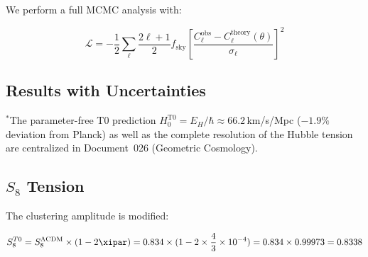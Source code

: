 	We perform a full MCMC analysis with:
	
	\begin{equation}
		\mathcal{L} = -\frac{1}{2}\sum_{\ell} \frac{2\ell+1}{2} f_{\text{sky}} \left[\frac{C_\ell^{\text{obs}} - C_\ell^{\text{theory}}(\theta)}{\sigma_\ell}\right]^2
	\end{equation}
	
	\subsection{Results with Uncertainties}
	
	\begin{table}[htbp]
		\centering
		\caption{T0 parameter constraints (68\% CL)}
		\label{tab:parameters}
	\end{table}
{$^*$The parameter-free T0 prediction $H_0^{\text{T0}} = E_H/\hbar \approx 66.2\,$km/s/Mpc ($-1.9\%$ deviation from Planck) as well as the complete resolution of the Hubble tension are centralized in Document~026 (Geometric Cosmology).}
	
	\subsection{$S_8$ Tension}
	
	The clustering amplitude is modified:
	
	\begin{equation}
		S_8^{T0} = S_8^{\Lambda\text{CDM}} \times (1 - 2\xipar) = 0.834 \times (1 - 2 \times \frac{4}{3} \times 10^{-4}) = 0.834 \times 0.99973 = 0.8338
	\end{equation}
	
